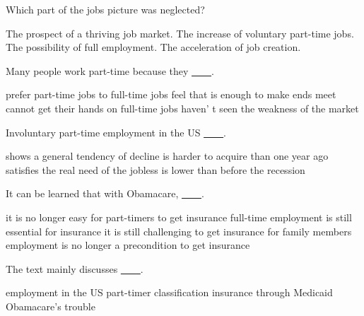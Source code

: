 \item Which part of the jobs picture was neglected?
\begin{tasks}
	\task The prospect of a thriving job market.
	\task The increase of voluntary part-time jobs.
	\task The possibility of full employment.
	\task The acceleration of job creation.
\end{tasks}
\item Many people work part-time because they \uline{~~~~}.
\begin{tasks}
	\task prefer part-time jobs to full-time jobs
	\task feel that is enough to make ends meet
	\task cannot get their hands on full-time jobs
	\task haven' t seen the weakness of the market
\end{tasks}
\item Involuntary part-time employment in the US \uline{~~~~}.
\begin{tasks}
	\task shows a general tendency of decline
	\task is harder to acquire than one year ago
	\task satisfies the real need of the jobless
	\task is lower than before the recession
\end{tasks}
\item It can be learned that with Obamacare, \uline{~~~~}.
\begin{tasks}
	\task it is no longer easy for part-timers to get insurance
	\task full-time employment is still essential for insurance
	\task it is still challenging to get insurance for family members
	\task employment is no longer a precondition to get insurance
\end{tasks}
\item The text mainly discusses \uline{~~~~}.
\begin{tasks}
	\task employment in the US
	\task part-timer classification
	\task insurance through Medicaid
	\task Obamacare's trouble
\end{tasks}